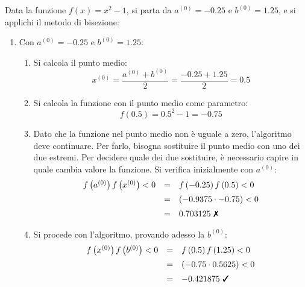 \begin{examplebox}
    Data la funzione $f\left(x\right) = x^{2} - 1$, si parta da $a^{(0)} = -0.25$ e $b^{(0)} = 1.25$, e si applichi il metodo di bisezione:
    \begin{enumerate}
        \item Con $a^{(0)} = -0.25$ e $b^{(0)} = 1.25$:
        \begin{enumerate}
            \item Si calcola il punto medio:
            \begin{equation*}
                x^{(0)} = \dfrac{a^{(0)} + b^{(0)}}{2} = \dfrac{-0.25 + 1.25}{2} = 0.5
            \end{equation*}

            \item Si calcola la funzione con il punto medio come parametro:
            \begin{equation*}
                f\left(0.5\right) = 0.5^{2} - 1 = -0.75
            \end{equation*}

            \item Dato che la funzione nel punto medio non è uguale a zero, l'algoritmo deve continuare. Per farlo, bisogna sostituire il punto medio con uno dei due estremi. Per decidere quale dei due sostituire, è necessario capire in quale cambia valore la funzione. Si verifica inizialmente con $a^{(0)}$:
            \begin{equation*}
                \begin{array}{rcl}
                    f\left(a^{(0)}\right)f\left(x^{(0)}\right) < 0 &=& f\left(-0.25\right)f\left(0.5\right) < 0 \\ [.5em]
                    &=& \left(-0.9375 \cdot -0.75\right) < 0 \\ [.5em]
                    &=& 0.703125 \text{ \ding{55}}
                \end{array}
            \end{equation*}
            
            \item Si procede con l'algoritmo, provando adesso la $b^{(0)}$:
            \begin{equation*}
                \begin{array}{rcl}
                    f\left(x^{(0)}\right)f\left(b^{(0)}\right) < 0 &=& f\left(0.5\right)f\left(1.25\right) < 0 \\ [.5em]
                    &=& \left(-0.75 \cdot 0.5625\right) < 0 \\ [.5em]
                    &=& -0.421875 \text{ \ding{51}}
                \end{array}
            \end{equation*}


\end{enumerate}
\end{enumerate}
\end{examplebox}

